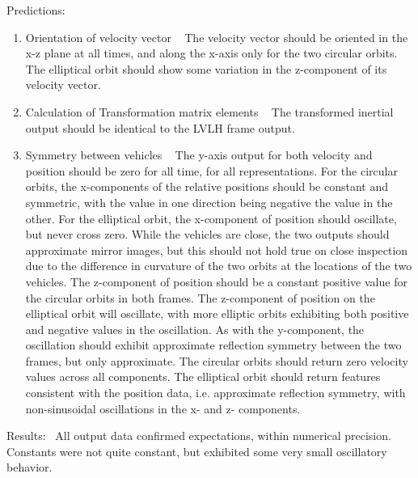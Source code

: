 \begin{description}
\item{Predictions:}
\begin{enumerate}
 \item {Orientation of velocity vector} \ \newline
The velocity vector should be oriented in the x-z plane at all times, and along the x-axis only for the two circular orbits.  The elliptical orbit should show some variation in the z-component of its velocity vector.

\item {Calculation of Transformation matrix elements} \ \newline
The transformed inertial output should be identical to the LVLH frame output.

\item {Symmetry between vehicles} \ \newline
The y-axis output for both velocity and position should be zero for all time, for all representations.
For the circular orbits, the x-components of the relative positions should be constant and symmetric, with the value in one direction being negative the value in the other.  For the elliptical orbit, the x-component of position should oscillate, but never cross zero.  While the vehicles are close, the two outputs should approximate mirror images, but this should not hold true on close inspection due to the difference in curvature of the two orbits at the locations of the two vehicles.
The z-component of position should be a constant positive value for the circular orbits in both frames.  The z-component of position on the elliptical orbit will oscillate, with more elliptic orbits exhibiting both positive and negative values in the oscillation.  As with the y-component, the oscillation should exhibit approximate reflection symmetry between the two frames, but only approximate. 
The circular orbits should return zero velocity values across all components.  The elliptical orbit should return features consistent with the position data, i.e. approximate reflection symmetry, with non-sinusoidal oscillations in the x- and z- components.
\end{enumerate}


\item{Results:}\ \newline
All output data confirmed expectations, within numerical precision.  Constants were not quite constant, but exhibited some very small oscillatory behavior.
\end{description}
